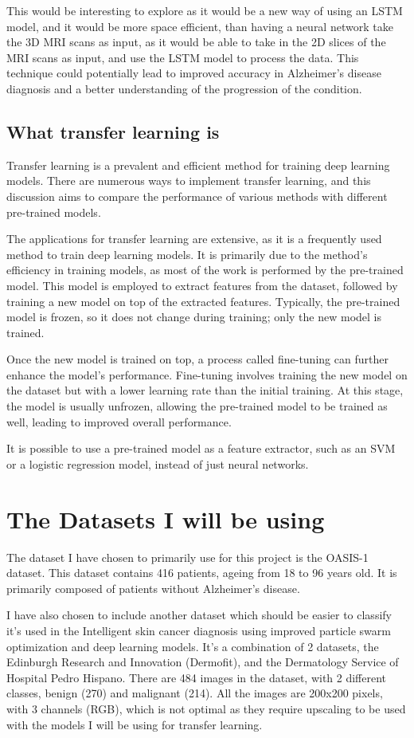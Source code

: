 \documentclass[]{final_report}
\begin{document}
This would be interesting to explore as it would be a new way of using an LSTM model, and it would be more space efficient, than having a neural network take the 3D MRI scans as input, as it would be able to take in the 2D slices of the MRI scans as input, and use the LSTM model to process the data. 
This technique could potentially lead to improved accuracy in Alzheimer's disease diagnosis and a better understanding of the progression of the condition.

\section{What transfer learning is}
Transfer learning is a prevalent and efficient method for training deep learning models. There are numerous ways to implement transfer learning, and this discussion aims to compare the performance of various methods with different pre-trained models.

The applications for transfer learning are extensive, as it is a frequently used method to train deep learning models. It is primarily due to the method's efficiency in training models, as most of the work is performed by the pre-trained model. This model is employed to extract features from the dataset, followed by training a new model on top of the extracted features. Typically, the pre-trained model is frozen, so it does not change during training; only the new model is trained.

Once the new model is trained on top, a process called fine-tuning can further enhance the model's performance. Fine-tuning involves training the new model on the dataset but with a lower learning rate than the initial training. At this stage, the model is usually unfrozen, allowing the pre-trained model to be trained as well, leading to improved overall performance.

It is possible to use a pre-trained model as a feature extractor, such as an SVM or a logistic regression model, instead of just neural networks.

\chapter{The Datasets I will be using}
The dataset I have chosen to primarily use for this project is the OASIS-1\cite{OASIS} dataset.
This dataset contains 416 patients, ageing from 18 to 96 years old. It is primarily composed of patients without Alzheimer's disease.

I have also chosen to include another dataset which should be easier to classify it's used in the Intelligent skin cancer diagnosis using improved particle swarm optimization and deep learning models\cite{TAN2019105725}.
It's a combination of 2 datasets, the Edinburgh Research and Innovation (Dermofit)\cite{Ballerini2013}, and the Dermatology Service of Hospital Pedro Hispano\cite{6610779}. There are 484 images in the dataset, with 2 different classes, benign (270) and malignant (214). All the images are 200x200 pixels, with 3 channels (RGB), which is not optimal as they require upscaling to be used with the models I will be using for transfer learning.
\end{document}

